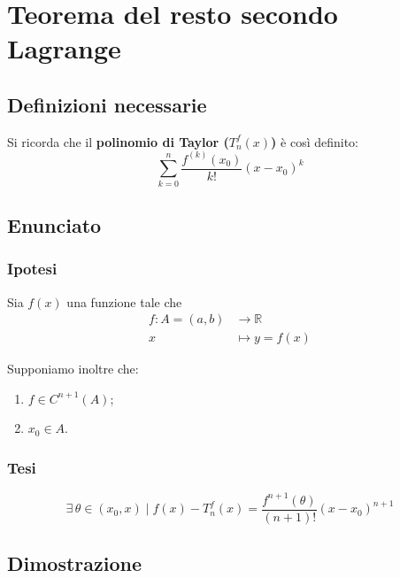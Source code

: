 \documentclass[../../dimostrazioni]{subfiles}
\begin{document}
    \chapter{Teorema del resto secondo Lagrange}
    \label{teorestoLagrange}

        \section*{Definizioni necessarie}

            Si ricorda che il \textbf{polinomio di Taylor (\(T _n ^ f (x) \))} è così definito:
            \[ \sum_{k = 0}^{n} \frac{f^{(k)} (x_0)}{k!}(x-x_0)^k\]

        \section*{Enunciato}

            \subsection*{Ipotesi}

                Sia \(f(x)\) una funzione tale che
                \begin{align*}
                    f : A = (a, b) &\longrightarrow \mathbb{R}\\
                    x &\longmapsto y = f(x) 
                \end{align*}

                Supponiamo inoltre che:

                \begin{enumerate}
                    \indentitem \item \(f \in C^{n+1} (A) \);
                    \indentitem \item \(x_0 \in A\).
                \end{enumerate}

            \subsection*{Tesi}

                \[  \exists \, \theta \in (x_0, x) \; | \; f(x) - T _n ^ f (x) = \frac{f^{n+1}(\theta)}{(n+1)!}(x-x_0)^{n+1} \]

        \section*{Dimostrazione}
\end{document}
